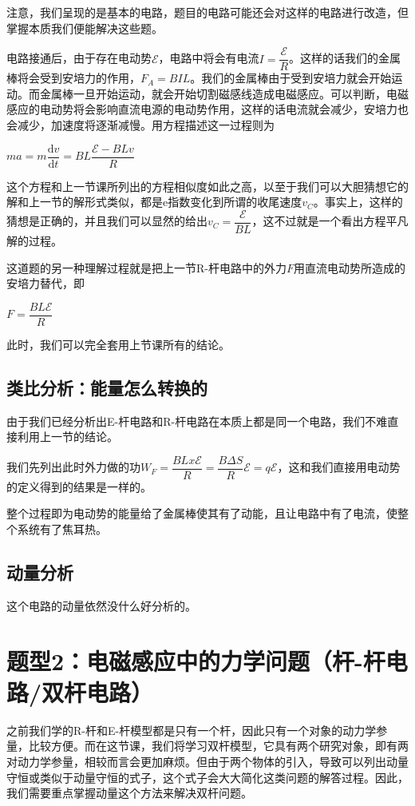 \documentclass{ctexbook}
\begin{document}
	\hspace*{\fill}
	
	注意，我们呈现的是基本的电路，题目的电路可能还会对这样的电路进行改造，但掌握本质我们便能解决这些题。
	
	电路接通后，由于存在电动势$\mathcal{E}$，电路中将会有电流$I=\dfrac{\mathcal{E}}{R}$。这样的话我们的金属棒将会受到安培力的作用，$F_A=BIL$。我们的金属棒由于受到安培力就会开始运动。而金属棒一旦开始运动，就会开始切割磁感线造成电磁感应。可以判断，电磁感应的电动势将会影响直流电源的电动势作用，这样的话电流就会减少，安培力也会减少，加速度将逐渐减慢。用方程描述这一过程则为
	
	\centerline{$ma=m\dfrac{\mathrm{d}v}{\mathrm{d}t}=BL\dfrac{\mathcal{E}-BLv}{R}$}
	
	这个方程和上一节课所列出的方程相似度如此之高，以至于我们可以大胆猜想它的解和上一节的解形式类似，都是e指数变化到所谓的收尾速度$v_C$。事实上，这样的猜想是正确的，并且我们可以显然的给出$v_C=\dfrac{\mathcal{E}}{BL}$，这不过就是一个看出方程平凡解的过程。
	
	这道题的另一种理解过程就是把上一节R-杆电路中的外力$F$用直流电动势所造成的安培力替代，即
	
	\centerline{$F=\dfrac{BL\mathcal{E}}{R}$}
	
	此时，我们可以完全套用上节课所有的结论。
	
	\subsection{类比分析：能量怎么转换的}
	
	由于我们已经分析出E-杆电路和R-杆电路在本质上都是同一个电路，我们不难直接利用上一节的结论。
	
	我们先列出此时外力做的功$W_F=\dfrac{BLx\mathcal{E}}{R}=\dfrac{B \Delta S}{R} \mathcal{E}=q \mathcal{E}$，这和我们直接用电动势的定义得到的结果是一样的。
	
	整个过程即为电动势的能量给了金属棒使其有了动能，且让电路中有了电流，使整个系统有了焦耳热。
	
	\subsection{动量分析}
	这个电路的动量依然没什么好分析的。
	
	\newpage
	
	\section{题型2：电磁感应中的力学问题（杆-杆电路/双杆电路）}
	之前我们学的R-杆和E-杆模型都是只有一个杆，因此只有一个对象的动力学参量，比较方便。而在这节课，我们将学习双杆模型，它具有两个研究对象，即有两对动力学参量，相较而言会更加麻烦。但由于两个物体的引入，导致可以列出动量守恒或类似于动量守恒的式子，这个式子会大大简化这类问题的解答过程。因此，我们需要重点掌握动量这个方法来解决双杆问题。
	
\end{document}
